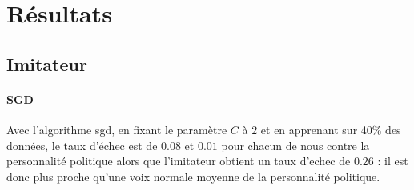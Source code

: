 \documentclass{article}
\begin{document}
\section{Résultats}
\subsection{Imitateur}
\paragraph{SGD}
Avec l'algorithme sgd, en fixant le paramètre $C$ à $2$ et en apprenant sur 40\% des données, le taux d'échec est de $0.08$ et $0.01$ pour chacun de nous contre la personnalité politique alors que l'imitateur obtient un taux d'echec de $0.26$ : il est donc plus proche qu'une voix normale moyenne de la personnalité politique.
\label{imitateur}



\end{document}
